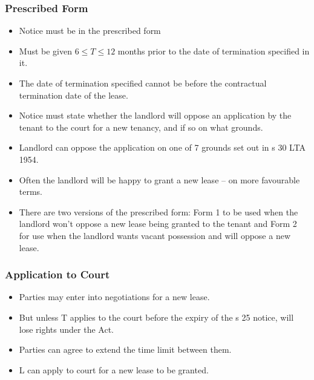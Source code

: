 \documentclass[
]{article}
\providecommand{\tightlist}{%
  \setlength{\itemsep}{0pt}\setlength{\parskip}{0pt}}
\begin{document}
\hypertarget{prescribed-form}{%
\subsubsection{Prescribed Form}\label{prescribed-form}}

\begin{itemize}
\tightlist
\item
  Notice must be in the prescribed form
\item
  Must be given \(6 \leq T \leq 12\) months prior to the date of
  termination specified in it.
\item
  The date of termination specified cannot be before the contractual
  termination date of the lease.
\item
  Notice must state whether the landlord will oppose an application by
  the tenant to the court for a new tenancy, and if so on what grounds.
\item
  Landlord can oppose the application on one of 7 grounds set out in s
  30 LTA 1954.
\item
  Often the landlord will be happy to grant a new lease -- on more
  favourable terms.
\item
  There are two versions of the prescribed form: Form 1 to be used when
  the landlord won't oppose a new lease being granted to the tenant and
  Form 2 for use when the landlord wants vacant possession and will
  oppose a new lease.
\end{itemize}

\hypertarget{application-to-court}{%
\subsubsection{Application to Court}\label{application-to-court}}

\begin{itemize}
\tightlist
\item
  Parties may enter into negotiations for a new lease.
\item
  But unless T applies to the court before the expiry of the s 25
  notice, will lose rights under the Act.
\item
  Parties can agree to extend the time limit between them.
\item
  L can apply to court for a new lease to be granted.
\end{itemize}
\end{document}
